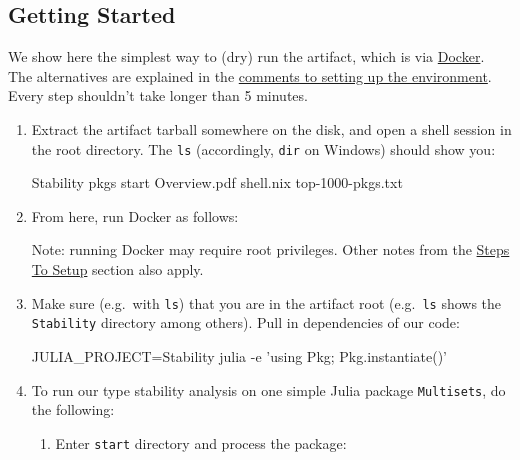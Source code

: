\documentclass[
]{article}
\author{}
\date{}
\begin{document}
\hypertarget{getting-started}{%
\subsection{Getting Started}\label{getting-started}}

We show here the simplest way to (dry) run the artifact, which is via
\href{https://docs.docker.com/get-docker/}{Docker}. The alternatives are
explained in the
\protect\hyperlink{comments-on-setting-up-environment}{comments to
setting up the environment}. Every step shouldn't take longer than 5
minutes.

\begin{enumerate}
\def\labelenumi{\arabic{enumi}.}
\item
  Extract the artifact tarball somewhere on the disk, and open a shell
  session in the root directory. The \texttt{ls} (accordingly,
  \texttt{dir} on Windows) should show you:

\begin{verbnobox}[\small]
Stability    pkgs    start    Overview.pdf    shell.nix    top-1000-pkgs.txt
\end{verbnobox}
\item
  From here, run Docker as follows:

{\small
{}
}

  Note: running Docker may require root privileges. Other notes from the
  \protect\hyperlink{steps-to-setup}{Steps To Setup} section also apply.
\item
  Make sure (e.g.~with \texttt{ls}) that you are in the artifact root
  (e.g.~\texttt{ls} shows the \texttt{Stability} directory among
  others). Pull in dependencies of our code:

\begin{verbnobox}[\small]
JULIA_PROJECT=Stability julia -e 'using Pkg; Pkg.instantiate()'
\end{verbnobox}
\item
  To run our type stability analysis on one simple Julia package
  \texttt{Multisets}, do the following:

  \begin{enumerate}
  \def\labelenumii{\alph{enumii}.}
  \item
    Enter \texttt{start} directory and process the package:


\end{enumerate}
\end{enumerate}
\end{document}
